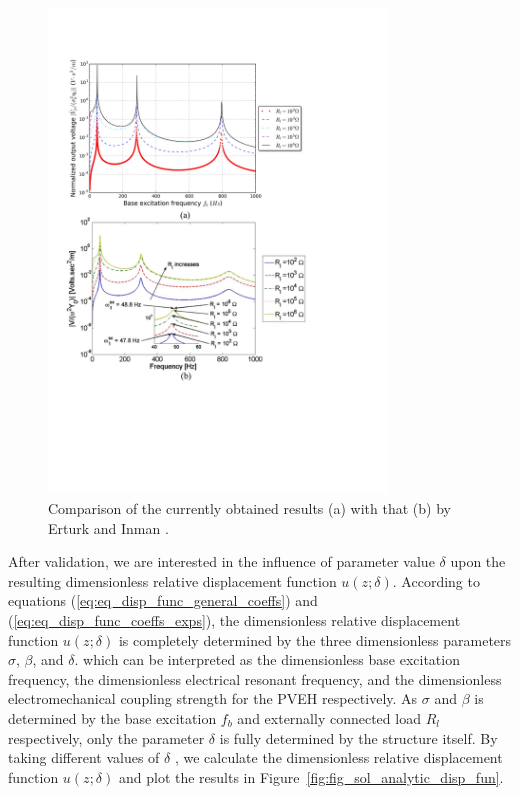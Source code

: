 \documentclass{article}
\begin{document}
\begin{figure}[!htbp]
    \centering
    \includegraphics[width=0.8\textwidth]{./img_eig_asy/fig_sol_analytic_perf_vs_fr_mod}
    \caption{Comparison of the currently obtained results (a) with that (b) by Erturk and Inman \cite{erturk2008distributed}.}
    \label{fig:fig_sol_analytic_perf_vs_fr_mod}
\end{figure}


After validation, we are interested in the influence of parameter value $\delta$ upon the resulting dimensionless relative displacement function $u(z;\delta)$. According to equations (\ref{eq:eq_disp_func_general_coeffs}) and (\ref{eq:eq_disp_func_coeffs_exps}), the dimensionless relative displacement function $u(z;\delta)$ is completely determined by the three dimensionless parameters $\sigma$, $\beta$, and $\delta$. which can be interpreted as the dimensionless base excitation frequency, the dimensionless electrical resonant frequency, and the dimensionless electromechanical coupling strength for the PVEH respectively. As $\sigma$ and $\beta$ is determined by the base excitation $f_b$ and externally connected load $R_l$ respectively, only the parameter $\delta$ is fully determined by the structure itself. By taking different values of $\delta$ , we calculate the dimensionless relative displacement function $u(z;\delta)$ and plot the results in Figure~\ref{fig:fig_sol_analytic_disp_fun}.
\end{document}
